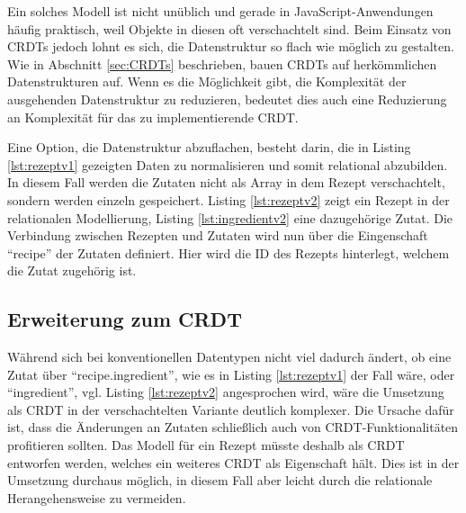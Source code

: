 \documentclass[a4paper, 12pt]{scrreprt}
\begin{document}

\begin{minipage}{\linewidth}
	
\end{minipage} 

Ein solches Modell ist nicht unüblich und gerade in JavaScript-Anwendungen häufig praktisch, weil Objekte in diesen oft verschachtelt sind. Beim Einsatz von \acp{CRDT} jedoch lohnt es sich, die Datenstruktur so flach wie möglich zu gestalten. Wie in Abschnitt \ref{sec:CRDTs} beschrieben, bauen \acp{CRDT} auf herkömmlichen Datenstrukturen auf. Wenn es die Möglichkeit gibt, die Komplexität der ausgehenden Datenstruktur zu reduzieren, bedeutet dies auch eine Reduzierung an Komplexität für das zu implementierende CRDT.

Eine Option, die Datenstruktur abzuflachen, besteht darin, die in Listing \ref{lst:rezeptv1} gezeigten Daten zu normalisieren und somit relational abzubilden. In diesem Fall werden die Zutaten nicht als Array in dem Rezept verschachtelt, sondern werden einzeln gespeichert. Listing \ref{lst:rezeptv2} zeigt ein Rezept in der relationalen Modellierung, Listing \ref{lst:ingredientv2} eine dazugehörige Zutat. Die Verbindung zwischen Rezepten und Zutaten wird nun über die Eingenschaft \enquote{recipe} der Zutaten definiert. Hier wird die ID des Rezepts hinterlegt, welchem die Zutat zugehörig ist.


\begin{minipage}{\linewidth}
	
\end{minipage}

\begin{minipage}{\linewidth}

\end{minipage}

\subsection{Erweiterung zum CRDT}
\label{sec:erweiterungCRDT}
Während sich bei konventionellen Datentypen nicht viel dadurch ändert, ob eine Zutat über \enquote{recipe.ingredient}, wie es in Listing \ref{lst:rezeptv1} der Fall wäre, oder \enquote{ingredient}, vgl. Listing \ref{lst:rezeptv2} angesprochen wird, wäre die Umsetzung als CRDT in der verschachtelten Variante deutlich komplexer. Die Ursache dafür ist, dass die Änderungen an Zutaten schließlich auch von CRDT-Funktionalitäten profitieren sollten. Das Modell für ein Rezept müsste deshalb als CRDT entworfen werden, welches ein weiteres CRDT als Eigenschaft hält. Dies ist in der Umsetzung durchaus möglich, in diesem Fall aber leicht durch die relationale Herangehensweise zu vermeiden.
\end{document}
